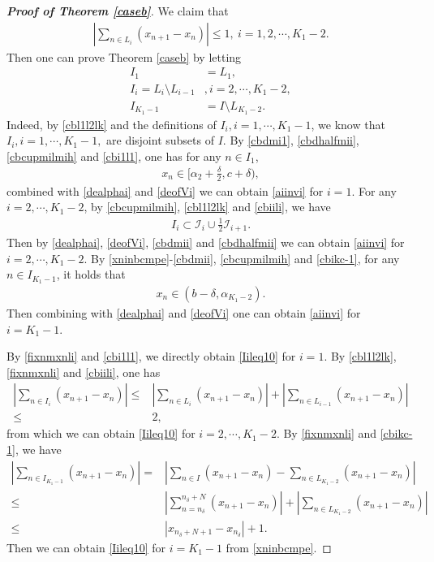 \documentclass[12pt]{amsart}
\newcommand{\abs}[1]{\left\lvert #1 \right\rvert}
\theoremstyle{plain}
\theoremstyle{definition}
\begin{document}
\begin{proof}[\textbf{Proof of Theorem \ref{caseb}}]
We claim that 
	\begin{align}
		\abs{\sum_{n\in L_i}(x_{n+1}-x_n)}\leq 1,\ i=1,2,\cdots,K_1-2.\label{fixnmxnli}
	\end{align}
	Then one can prove Theorem \ref{caseb} by letting
	\begin{align}
		I_1&=L_1,\label{cbi1l1}\\
		I_{i}=L_i\setminus L_{i-1}&,i=2,\cdots,K_1-2,\label{cbiili}\\
		I_{K_1-1}&=I\setminus L_{K_1-2}.\label{cbikc-1}
	\end{align}
Indeed, by \eqref{cbl1l2lk} and the definitions of $I_i,i=1,\cdots,K_1-1$, we know that $I_i,i=1,\cdots,K_1-1,$ are disjoint subsets of $I$.
By \eqref{cbdmi1},  \eqref{cbdhalfmii}, \eqref{cbcupmilmih} and \eqref{cbi1l1}, one has for any $n\in I_1$,
\begin{align}
	x_n\in \Big[\alpha_2+\frac{\delta}{2},c+\delta\Big),\nonumber
\end{align} combined with \eqref{dealphai} and \eqref{deofVi}
we can obtain \eqref{aiinvi} for $i=1$. For any $i=2,\cdots,K_1-2$, by \eqref{cbcupmilmih}, \eqref{cbl1l2lk} and \eqref{cbiili}, we have 
\begin{align}
	I_i\subset \mathcal{I}_i\cup\frac{1}{2}\mathcal{I}_{i+1}.\nonumber
\end{align}
Then by \eqref{dealphai}, \eqref{deofVi}, \eqref{cbdmii} and \eqref{cbdhalfmii} we can obtain \eqref{aiinvi} for $i=2,\cdots,K_1-2$. By \eqref{xninbcmpe}-\eqref{cbdmii}, \eqref{cbcupmilmih} and \eqref{cbikc-1}, for any $n\in I_{K_1-1}$,
it holds that
\begin{align}
	x_n\in (b-\delta,\alpha_{K_1-2}).\nonumber
\end{align}
Then combining with \eqref{dealphai} and  \eqref{deofVi} one can obtain \eqref{aiinvi} for $i=K_1-1$.


	
	
	
By \eqref{fixnmxnli} and \eqref{cbi1l1}, we directly obtain \eqref{Iileq10} for $i=1$. By \eqref{cbl1l2lk}, \eqref{fixnmxnli} and \eqref{cbiili}, one has
\begin{align}
	\abs{\sum_{n\in I_i}(x_{n+1}-x_n)}\leq &\abs{\sum_{n\in L_i}(x_{n+1}-x_n)}+\abs{\sum_{n\in L_{i-1}}(x_{n+1}-x_n)}\nonumber\\
	\leq &2,\nonumber
\end{align}
from which we can obtain \eqref{Iileq10} for $i=2,\cdots,K_1-2$. By \eqref{fixnmxnli} and \eqref{cbikc-1}, we have
	\begin{align}
		\abs{\sum_{n\in I_{K_1-1}}(x_{n+1}-x_n)}=&\abs{\sum_{n\in I}(x_{n+1}-x_n)-\sum_{n\in L_{K_1-2}}(x_{n+1}-x_n)}\nonumber\\
		\leq&\abs{\sum_{n=n_{\delta}}^{n_\delta+N}(x_{n+1}-x_n)}+\abs{\sum_{n\in L_{K_1-2}}(x_{n+1}-x_n)}\nonumber\\
		\leq &\abs{x_{n_\delta+N+1}-x_{n_\delta}}+1.\nonumber
	\end{align}
	 Then we can obtain \eqref{Iileq10} for $i=K_1-1$ from \eqref{xninbcmpe}.
	 

\end{proof}
\end{document}
